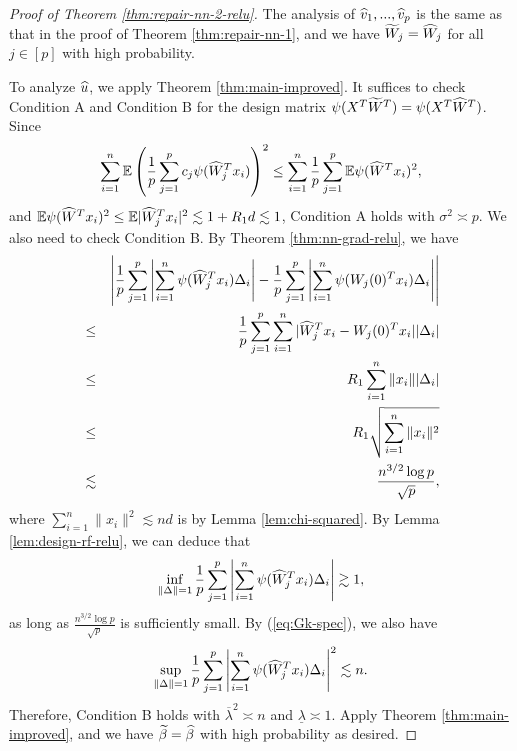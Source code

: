 \begin{proof}[Proof of Theorem \ref{thm:repair-nn-2-relu}]
The analysis of $\widehat{v}_1,...,\widehat{v}_p$ is the same as that in the proof of Theorem \ref{thm:repair-nn-1}, and we have $\widetilde{W}_j=\widehat{W}_j$ for all $j\in[p]$ with high probability.

To analyze $\widehat{u}$, we apply Theorem \ref{thm:main-improved}. It suffices to check Condition A and Condition B for the design matrix $\psi(X^T\widetilde{W}^T)=\psi(X^T\widehat{W}^T)$. Since
$$\sum_{i=1}^n\mathbb{E}\left(\frac{1}{p}\sum_{j=1}^pc_j\psi(\widehat{W}_j^Tx_i)\right)^2\leq \sum_{i=1}^n\frac{1}{p}\sum_{j=1}^p\mathbb{E}\psi(\widehat{W}^Tx_i)^2,$$
and $\mathbb{E}\psi(\widehat{W}^Tx_i)^2\leq \mathbb{E}|\widehat{W}_j^Tx_i|^2\lesssim 1 + R_1d\lesssim 1$, Condition A holds with $\sigma^2\asymp p$.
We also need to check Condition B. By Theorem \ref{thm:nn-grad-relu}, we have
\begin{eqnarray*}
&& \left|\frac{1}{p}\sum_{j=1}^p\left|\sum_{i=1}^n\psi(\wh{W}_j^Tx_i)\Delta_i\right| - \frac{1}{p}\sum_{j=1}^p\left|\sum_{i=1}^n\psi(W_j(0)^Tx_i)\Delta_i\right|\right| \\
&\leq& \frac{1}{p}\sum_{j=1}^p\sum_{i=1}^n|\wh{W}_j^Tx_i-W_j(0)^Tx_i||\Delta_i| \\
&\leq& R_1\sum_{i=1}^n\|x_i\||\Delta_i| \\
&\leq& R_1\sqrt{\sum_{i=1}^n\|x_i\|^2} \\
&\lesssim& \frac{n^{3/2}\log p}{\sqrt{p}},
\end{eqnarray*}
where $\sum_{i=1}^n\|x_i\|^2\lesssim nd$ is by Lemma \ref{lem:chi-squared}. By Lemma \ref{lem:design-rf-relu}, we can deduce that
$$\inf_{\|\Delta\|=1}\frac{1}{p}\sum_{j=1}^p\left|\sum_{i=1}^n\psi(\widehat{W}_j^Tx_i)\Delta_i\right|\gtrsim 1,$$
as long as $\frac{n^{3/2}\log p}{\sqrt{p}}$ is sufficiently small. By (\ref{eq:Gk-spec}), we also have
$$\sup_{\|\Delta\|=1}\frac{1}{p}\sum_{j=1}^p\left|\sum_{i=1}^n\psi(\widehat{W}_j^Tx_i)\Delta_i\right|^2\lesssim n.$$
Therefore, Condition B holds with $\overline{\lambda}^2\asymp n$ and $\underline{\lambda}\asymp 1$. Apply Theorem \ref{thm:main-improved}, and we have $\widetilde{\beta}=\widehat{\beta}$ with high probability as desired.
\end{proof}
